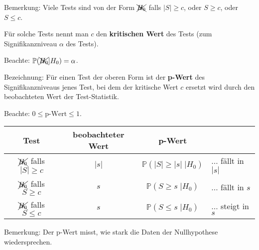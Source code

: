 \documentclass{tstextbook}
\newcommand{\Prob}{\mathbb P}
\begin{document}
\begin{remark}
	Bemerkung: Viele Tests sind von der Form $ \xcancel{H_0} $ falls $ |S| \ge c $, oder $ S \ge c $, oder $ S \le c $. 
	
	Für solche Tests nennt man $ c $ den \textbf{kritischen Wert} des Tests (zum Signifikanzniveau $ \alpha $ des Tests).
	
	Beachte: $ \Prob(\xcancel{H_0}|H_0) = \alpha $.
\end{remark}

\begin{remark}
	Bezeichnung: Für einen Test der oberen Form ist der \textbf{p-Wert} des Signifikanzniveaus jenes Test, bei dem der kritische Wert $ c $ ersetzt wird durch den beobachteten Wert der Test-Statistik. 
	
	Beachte: $ 0\le \text{p-Wert} \le 1 $.
\end{remark}

\begin{center}
\begin{tabular}{c|c|cl}
	Test 	& beobachteter Wert	& p-Wert 	& \\
	\midrule
	$ \xcancel{H_0} $ falls $ |S|\ge c $ & $ |s| $ & $ \Prob(|S|\ge|s|\;|H_0) $ & $\ldots$ fällt in $ |s| $ \\
	$ \xcancel{H_0} $ falls $ S\ge c $ & $ s $ & $ \Prob(S\ge s\;|H_0) $ & $\ldots$ fällt in $ s $ \\
	$ \xcancel{H_0} $ falls $ S\le c $ & $ s $ & $ \Prob(S\le s\;|H_0) $ & $\ldots$ steigt in $ s $	
\end{tabular}
\end{center}
\vspace{0.5cm}

\begin{remark}
	Bemerkung: Der p-Wert misst, wie stark die Daten der Nullhypothese wiedersprechen.
\end{remark}
\end{document}

